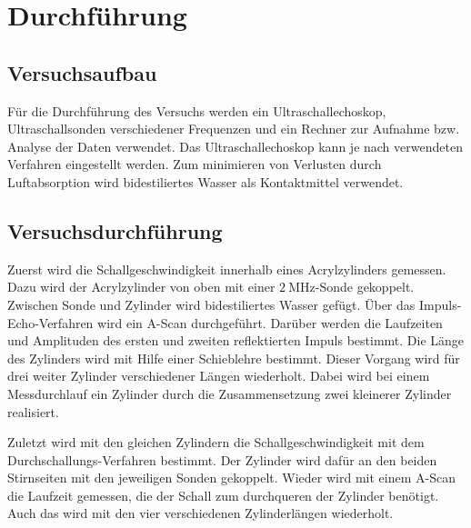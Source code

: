 \section{Durchführung}
\label{sec:Durchführung}

\subsection{Versuchsaufbau}
Für die Durchführung des Versuchs werden ein Ultraschallechoskop, Ultraschallsonden verschiedener Frequenzen und ein Rechner zur Aufnahme bzw. Analyse der Daten verwendet. Das Ultraschallechoskop kann je nach verwendeten Verfahren eingestellt werden. Zum minimieren von Verlusten durch Luftabsorption wird bidestiliertes Wasser als Kontaktmittel verwendet.

\subsection{Versuchsdurchführung}
Zuerst wird die Schallgeschwindigkeit innerhalb eines Acrylzylinders gemessen. Dazu wird der Acrylzylinder von oben mit einer $\SI{2}{\mega\hertz}$-Sonde gekoppelt. Zwischen Sonde und Zylinder wird bidestiliertes Wasser gefügt. Über das Impuls-Echo-Verfahren wird ein A-Scan durchgeführt. Darüber werden die Laufzeiten und Amplituden des ersten und zweiten reflektierten Impuls bestimmt. Die Länge des Zylinders wird mit Hilfe einer Schieblehre bestimmt. Dieser Vorgang wird für drei weiter Zylinder verschiedener Längen wiederholt. Dabei wird bei einem Messdurchlauf ein Zylinder durch die Zusammensetzung zwei kleinerer Zylinder realisiert. 

Zuletzt wird mit den gleichen Zylindern die Schallgeschwindigkeit mit dem Durchschallungs-Verfahren bestimmt. Der Zylinder wird dafür an den beiden Stirnseiten mit den jeweiligen Sonden gekoppelt. Wieder wird mit einem A-Scan die Laufzeit gemessen, die der Schall zum durchqueren der Zylinder benötigt. Auch das wird mit den vier verschiedenen Zylinderlängen wiederholt.


